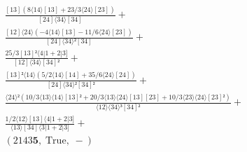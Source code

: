 \documentclass[varwidth, border=5pt]{standalone}
\begin{document}
\begin{my}
$\begin{gathered}
\scriptscriptstyle\frac{[13](8⟨14⟩[13]+23/3⟨24⟩[23])}{[24]⟨34⟩[34]} +\\
\scriptscriptstyle\frac{[12]⟨24⟩(-4⟨14⟩[13]-11/6⟨24⟩[23])}{[24]⟨34⟩²[34]} +\\
\scriptscriptstyle\frac{25/3[13]²⟨4|1+2|3]}{[12]⟨34⟩[34]²} +\\
\scriptscriptstyle\frac{[13]²⟨14⟩(5/2⟨14⟩[14]+35/6⟨24⟩[24])}{[24]⟨34⟩²[34]²} +\\
\scriptscriptstyle\frac{⟨24⟩²(10/3⟨13⟩⟨14⟩[13]²+20/3⟨13⟩⟨24⟩[13][23]+10/3⟨23⟩⟨24⟩[23]²)}{⟨12⟩⟨34⟩³[34]²} +\\
\scriptscriptstyle\frac{1/2⟨12⟩[13]⟨4|1+2|3]}{⟨13⟩[34]⟨3|1+2|3]} +\\
\scriptscriptstyle(2143𝟓,\;\text{True},\;-) \phantom{+}
\end{gathered}$
\end{my}
\end{document}
